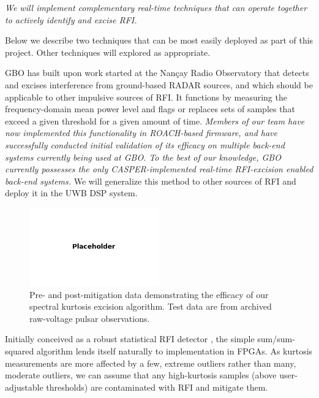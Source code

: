 \documentclass[10pt]{myNSF}
\begin{document}
\label{sec:rfi_excision}

\emph{We will implement complementary real-time techniques that can
  operate together to actively identify and excise RFI.}

Below we describe two techniques that can be most easily deployed as
part of this project.  Other techniques will explored as appropriate.

 GBO has built upon
work started at the Nan\c{c}ay Radio Observatory \citep{dwr17} that
detects and excises interference from ground-based RADAR sources, and
which should be applicable to other impulsive sources of RFI.  It
functions by measuring the frequency-domain mean power level and flags
or replaces sets of samples that exceed a given threshold for a given
amount of time.  \emph{Members of our team have now implemented this
  functionality in ROACH-based firmware, and have successfully
  conducted initial validation of its efficacy on multiple back-end
  systems currently being used at GBO.  To the best of our knowledge,
  GBO currently possesses the only CASPER-implemented real-time
  RFI-excision enabled back-end systems.}  We will generalize this
method to other sources of RFI and deploy it in the UWB DSP system.

\begin{figure}
  \centering
  \includegraphics[width=0.5\textwidth]{placeholder.png}
  \caption{Pre- and post-mitigation data demonstrating the efficacy of
    our spectral kurtosis excision algorithm.  Test data are from
    archived raw-voltage pulsar observations. \label{fig:sk}}
\end{figure}

 Initially conceived as a robust
statistical RFI detector \citep{ng10,nhmg16}, the simple
sum/sum-squared algorithm lends itself naturally to implementation in
FPGAs.  As kurtosis measurements are more affected by a few, extreme
outliers rather than many, moderate outliers, we can assume that any
high-kurtosis samples (above user-adjustable thresholds) are
contaminated with RFI and mitigate them.
\end{document}
